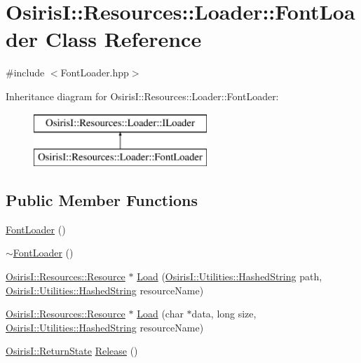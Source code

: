 \hypertarget{class_osiris_i_1_1_resources_1_1_loader_1_1_font_loader}{\section{Osiris\-I\-:\-:Resources\-:\-:Loader\-:\-:Font\-Loader Class Reference}
\label{class_osiris_i_1_1_resources_1_1_loader_1_1_font_loader}
}


{\ttfamily \#include $<$Font\-Loader.\-hpp$>$}

Inheritance diagram for Osiris\-I\-:\-:Resources\-:\-:Loader\-:\-:Font\-Loader\-:\begin{figure}[H]
\begin{center}
\leavevmode
\includegraphics[height=2.000000cm]{class_osiris_i_1_1_resources_1_1_loader_1_1_font_loader}
\end{center}
\end{figure}
\subsection*{Public Member Functions}
\begin{DoxyCompactItemize}
\item 
\hyperlink{class_osiris_i_1_1_resources_1_1_loader_1_1_font_loader_aa5cf6ff66365df191914d6d12e1d56f9}{Font\-Loader} ()
\item 
\hyperlink{class_osiris_i_1_1_resources_1_1_loader_1_1_font_loader_a524ef8091d7b6d8d62b03de2bba2c818}{$\sim$\-Font\-Loader} ()
\item 
\hyperlink{class_osiris_i_1_1_resources_1_1_resource}{Osiris\-I\-::\-Resources\-::\-Resource} $\ast$ \hyperlink{class_osiris_i_1_1_resources_1_1_loader_1_1_font_loader_a8e51933dd797c35b471e6461199e3516}{Load} (\hyperlink{class_osiris_i_1_1_utilities_1_1_hashed_string}{Osiris\-I\-::\-Utilities\-::\-Hashed\-String} path, \hyperlink{class_osiris_i_1_1_utilities_1_1_hashed_string}{Osiris\-I\-::\-Utilities\-::\-Hashed\-String} resource\-Name)
\item 
\hyperlink{class_osiris_i_1_1_resources_1_1_resource}{Osiris\-I\-::\-Resources\-::\-Resource} $\ast$ \hyperlink{class_osiris_i_1_1_resources_1_1_loader_1_1_font_loader_abae2a095bbaeae3416fbc395ca26681b}{Load} (char $\ast$data, long size, \hyperlink{class_osiris_i_1_1_utilities_1_1_hashed_string}{Osiris\-I\-::\-Utilities\-::\-Hashed\-String} resource\-Name)
\item 
\hyperlink{namespace_osiris_i_a8f53bf938dc75c65c6a529694514013e}{Osiris\-I\-::\-Return\-State} \hyperlink{class_osiris_i_1_1_resources_1_1_loader_1_1_font_loader_ac2a29c22e97b74ef49b7b574394856ed}{Release} ()
\end{DoxyCompactItemize}


